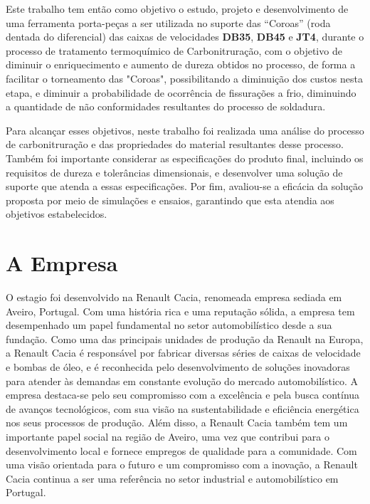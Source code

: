 Este trabalho tem então como objetivo o estudo, projeto e desenvolvimento de uma ferramenta porta-peças a ser utilizada no suporte das “Coroas” (roda dentada do diferencial) das caixas de velocidades \textbf{DB35}, \textbf{DB45} e \textbf{JT4}, durante o processo de tratamento termoquímico de Carbonitruração, com o objetivo de diminuir o enriquecimento e aumento de dureza obtidos no processo, de forma a facilitar o torneamento das "Coroas", possibilitando a diminuição dos custos nesta etapa, e diminuir a probabilidade de ocorrência de fissurações a frio, diminuindo a quantidade de não conformidades resultantes do processo de soldadura.
\par
\newpage
Para alcançar esses objetivos, neste trabalho foi realizada uma análise do processo de carbonitruração e das propriedades do material resultantes desse processo. Também foi importante considerar as especificações do produto final, incluindo os requisitos de dureza e tolerâncias dimensionais, e desenvolver uma solução de suporte que atenda a essas especificações. Por fim, avaliou-se a eficácia da solução proposta por meio de simulações e ensaios, garantindo que esta atendia aos objetivos estabelecidos.
\section{A Empresa} \label{s:intro_empresa}
O estagio foi desenvolvido na Renault Cacia, renomeada empresa sediada em Aveiro, Portugal. Com uma história rica e uma reputação sólida, a empresa tem desempenhado um papel fundamental no setor automobilístico desde a sua fundação. Como uma das principais unidades de produção da Renault na Europa, a Renault Cacia é responsável por fabricar diversas séries de caixas de velocidade e bombas de óleo, e é reconhecida pelo desenvolvimento de soluções inovadoras para atender às demandas em constante evolução do mercado automobilístico. A empresa destaca-se pelo seu compromisso com a excelência e pela busca contínua de avanços tecnológicos, com sua visão na sustentabilidade e eficiência energética nos seus processos de produção. Além disso, a Renault Cacia também tem um importante papel social na região de Aveiro, uma vez que contribui para o desenvolvimento local e fornece empregos de qualidade para a comunidade.
Com uma visão orientada para o futuro e um compromisso com a inovação, a Renault Cacia continua a ser uma referência no setor industrial e automobilístico em Portugal.

